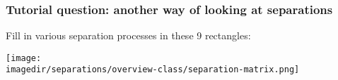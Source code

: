 \begin{frame}\frametitle{Tutorial question: another way of looking at separations}
	Fill in various separation processes in these 9 rectangles:
	\begin{center}
		\texttt{[image: \\imagedir/separations/overview-class/separation-matrix.png]}
	\end{center}
\end{frame}


